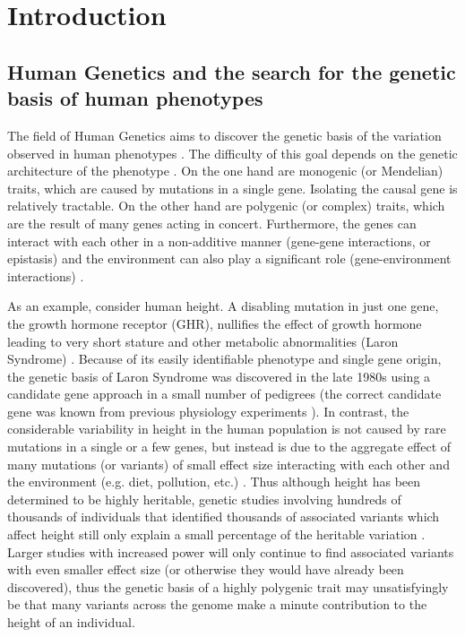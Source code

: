 \chapter{Introduction}

\section{Human Genetics and the search for the genetic basis of human phenotypes}

The field of Human Genetics aims to discover the genetic basis of the
variation observed in human phenotypes \citep{Strachan2011}. The difficulty of this goal
depends on the genetic architecture of the phenotype \citep{DiRienzo2006, Bodmer2008, Schork2009}. On the one hand
are monogenic (or Mendelian) traits, which are
caused by mutations in a single gene. Isolating the causal gene is
relatively tractable. On the other hand are polygenic (or complex)
traits, which are the result of many genes acting in
concert. Furthermore, the genes can interact with each other in a
non-additive manner (gene-gene interactions, or epistasis) \citep{Cordell2009, Mechanic2012} and the
environment can also play a significant role (gene-environment
interactions) \citep{Thomas2010, Ober2011}.

As an example, consider human height. A disabling mutation in just one
gene, the growth hormone receptor (GHR), nullifies the effect of
growth hormone leading to very short stature and other metabolic
abnormalities (Laron Syndrome) \citep{Laron2011}. Because of its easily identifiable
phenotype and single gene origin, the genetic basis of Laron Syndrome
was discovered in the late 1980s using a candidate gene approach
in a small number of pedigrees \citep{Amselem1989, Godowski1989, Shevah2011}
(the correct candidate gene was known from previous physiology experiments \citep{Eshet1984}). In
contrast, the considerable variability in height in the human
population is not caused by rare mutations in a single or a few genes,
but instead is due to the aggregate effect of many mutations (or variants) of small
effect size interacting with each other and the environment
(e.g. diet, pollution, etc.) \citep{Lettre2011, Turchin2012}. Thus although height has been determined
to be highly heritable, genetic studies involving hundreds of
thousands of individuals that identified thousands of associated
variants which affect height still only explain a small percentage of
the heritable variation \citep{LangoAllen2010, Wood2014}. Larger studies with increased power will only
continue to find associated variants with even smaller effect size (or
otherwise they would have already been discovered), thus the genetic
basis of a highly polygenic trait
may unsatisfyingly be that many variants across the genome make a minute
contribution to the height of an individual.

